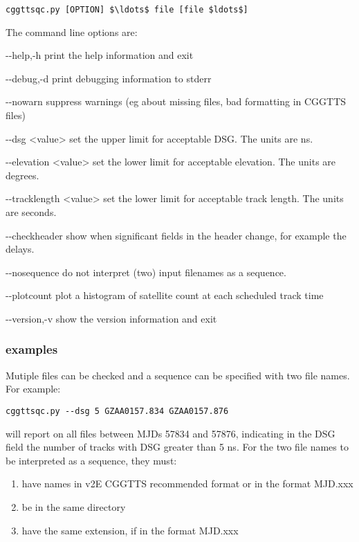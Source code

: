 \begin{lstlisting}[mathescape=true]
cggttsqc.py [OPTION] $\ldots$ file [file $ldots$]
\end{lstlisting}
The command line options are:
\begin{description*}
	\item[-{}-help,-h]	print the help information and exit
	\item[-{}-debug,-d]	print debugging information to stderr
	\item[-{}-nowarn]   suppress warnings (eg about missing files, bad formatting in CGGTTS files)
	\item[-{}-dsg \textless{value}\textgreater]  set the upper limit for acceptable DSG. The units are ns.
	\item[-{}-elevation \textless{value}\textgreater] set the lower limit for acceptable elevation. The units are degrees.
	\item[-{}-tracklength  \textless{value}\textgreater] set the lower limit for acceptable track length. The units are seconds.
	\item[-{}-checkheader] show when significant fields in the header change, for example the delays.
	\item[-{}-nosequence] do not interpret (two) input filenames as a sequence.
	\item[-{}-plotcount]  plot a histogram of satellite count at each scheduled track time
	\item[-{}-version,-v] show the version information and exit
\end{description*}

\subsubsection{examples}

Mutiple files can be checked and a sequence can be specified with two file names.
For example:
\begin{lstlisting}
cggttsqc.py --dsg 5 GZAA0157.834 GZAA0157.876
\end{lstlisting}
will report on all files between MJDs 57834 and 57876, indicating in the DSG field the number of tracks with DSG greater
than 5 ns. For the two file names to be interpreted as a sequence, they must:
\begin{enumerate}
	\item have names in v2E CGGTTS recommended format or in the format MJD.xxx
	\item be in the same directory
	\item have the same extension, if in the format MJD.xxx
\end{enumerate}
